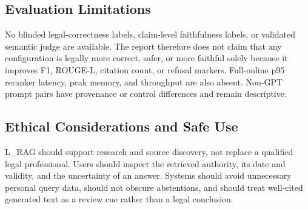 \subsection{Evaluation Limitations}
\label{sec:evaluation-limitations}

No blinded legal-correctness labels, claim-level faithfulness labels, or
validated semantic judge are available. The report therefore does not claim
that any configuration is legally more correct, safer, or more faithful solely
because it improves F1, ROUGE-L, citation count, or refusal markers. Full-online
p95 reranker latency, peak memory, and throughput are also absent. Non-GPT
prompt pairs have provenance or control differences and remain descriptive.

\subsection{Ethical Considerations and Safe Use}
\label{sec:ethical-safe-use}

L\_RAG should support research and source discovery, not replace a qualified
legal professional. Users should inspect the retrieved authority, its date and
validity, and the uncertainty of an answer. Systems should avoid unnecessary
personal query data, should not obscure abstentions, and should treat
well-cited generated text as a review cue rather than a legal conclusion.
